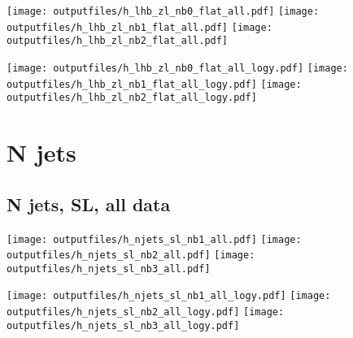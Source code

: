 \documentclass[11pt]{article}
\begin{document}
    \noindent
     \texttt{[image: outputfiles/h\_lhb\_zl\_nb0\_flat\_all.pdf]}
     \texttt{[image: outputfiles/h\_lhb\_zl\_nb1\_flat\_all.pdf]}
     \texttt{[image: outputfiles/h\_lhb\_zl\_nb2\_flat\_all.pdf]}

    \noindent
     \texttt{[image: outputfiles/h\_lhb\_zl\_nb0\_flat\_all\_logy.pdf]}
     \texttt{[image: outputfiles/h\_lhb\_zl\_nb1\_flat\_all\_logy.pdf]}
     \texttt{[image: outputfiles/h\_lhb\_zl\_nb2\_flat\_all\_logy.pdf]}















  \clearpage
   \section{ N jets }

    \subsection{ N jets, SL, all data}

    \noindent
     \texttt{[image: outputfiles/h\_njets\_sl\_nb1\_all.pdf]}
     \texttt{[image: outputfiles/h\_njets\_sl\_nb2\_all.pdf]}
     \texttt{[image: outputfiles/h\_njets\_sl\_nb3\_all.pdf]}

    \noindent
     \texttt{[image: outputfiles/h\_njets\_sl\_nb1\_all\_logy.pdf]}
     \texttt{[image: outputfiles/h\_njets\_sl\_nb2\_all\_logy.pdf]}
     \texttt{[image: outputfiles/h\_njets\_sl\_nb3\_all\_logy.pdf]}
\end{document}
